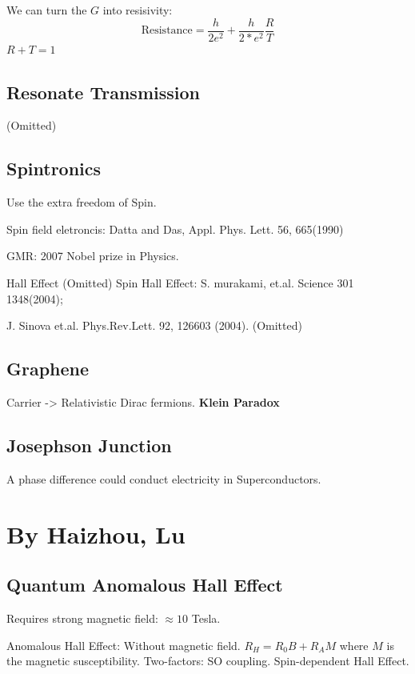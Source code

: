 \documentclass{article}
\numberwithin{equation}{subsection} %
\theoremstyle{definition}
\begin{document}
We can turn the $G$ into resisivity: 
$$\text{Resistance}= \frac{h}{2e^2} + \frac{h}{2*e^2}\frac{R}{T}$$
$R+T=1$

\subsection{Resonate Transmission} (Omitted)

\subsection{Spintronics} Use the extra freedom of Spin. 

Spin field eletroncis: Datta and Das, Appl. Phys. Lett. 56, 665(1990)

GMR: 2007 Nobel prize in Physics.

Hall Effect (Omitted)
Spin Hall Effect: S. murakami, et.al. Science 301 1348(2004);


J. Sinova et.al. Phys.Rev.Lett. 92, 126603 (2004). (Omitted)

\subsection{Graphene} Carrier -> Relativistic Dirac fermions.
\textbf{Klein Paradox} 

\subsection{Josephson Junction} A phase difference could conduct
electricity in Superconductors.



\section{By Haizhou, Lu}
\subsection{Quantum Anomalous Hall Effect}
Requires strong magnetic field: $\approx 10$ Tesla.

Anomalous Hall Effect: Without magnetic field. $R_H = R_0 B+ R_A M$
where $M$ is the magnetic susceptibility.
Two-factors: SO coupling. Spin-dependent Hall Effect.
\end{document}
